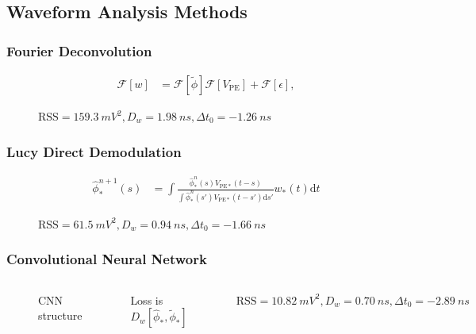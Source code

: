 \documentclass{beamer}
\begin{document}
\begin{CJK*}{UTF8}{gbsn}
\section{Waveform Analysis Methods}

\begin{frame}
\frametitle{Fourier Deconvolution}
\begin{align*}
  \mathcal{F}[w] &= \mathcal{F}[\tilde{\phi}]\mathcal{F}[V_\mathrm{PE}] + \mathcal{F}[\epsilon],
\end{align*}
\begin{figure}
    \centering
    \resizebox{0.6\textwidth}{!}{}
    \caption{$\mathrm{RSS}=\SI{159.3}{mV^2},D_w=\SI{1.98}{ns},\Delta t_0=\SI{-1.26}{ns}$}
\end{figure}
\end{frame}

\begin{frame}
\frametitle{Lucy Direct Demodulation}
\begin{align*}
  \hat{\phi}_*^{n+1}(s) &= \int \frac{\hat{\phi}_*^n(s) V_{\mathrm{PE}*}(t-s)}{\int\hat{\phi}_*^n(s') V_{\mathrm{PE}*}(t-s')\mathrm{d}s'} w_*(t) \mathrm{d}t
\end{align*}
\begin{figure}
    \centering
    \resizebox{0.6\textwidth}{!}{}
    \caption{$\mathrm{RSS}=\SI{61.5}{mV^2},D_w=\SI{0.94}{ns},\Delta t_0=\SI{-1.66}{ns}$}
\end{figure}
\end{frame}

\begin{frame}
\frametitle{Convolutional Neural Network}
\begin{columns}
\begin{figure}
    \centering
    \begin{adjustbox}{width=0.65\textwidth}
        
    \end{adjustbox}
    \caption{CNN structure}
\end{figure}
\begin{center}
    Loss is $D_w[\hat{\phi}_*, \tilde{\phi}_*]$
\end{center}
\begin{figure}
    \centering
    \resizebox{\textwidth}{!}{}
    \caption{$\mathrm{RSS}=\SI{10.82}{mV^2},D_w=\SI{0.70}{ns},\Delta t_0=\SI{-2.89}{ns}$}
\end{figure}
\end{columns}
\end{frame}


\end{CJK*}
\end{document}
